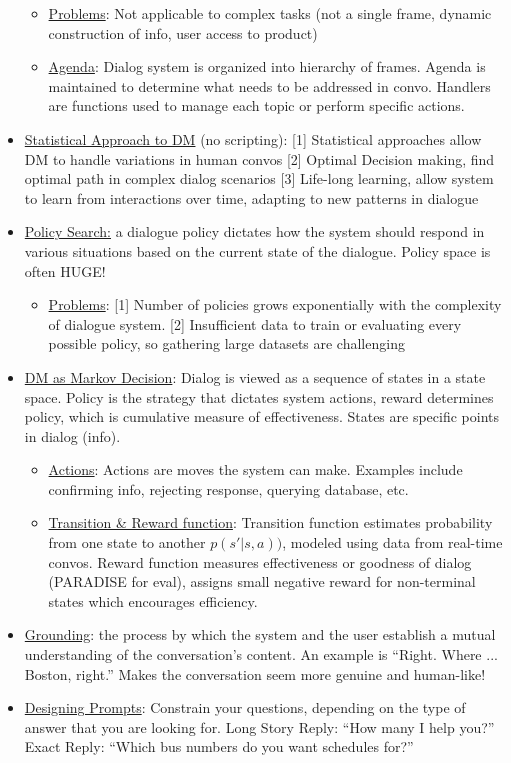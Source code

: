 \begin{itemize}
    \begin{itemize}
        \item \underline{Problems}: Not applicable to complex tasks (not a single frame, dynamic construction of info, user access to product)
        \item \underline{Agenda}: Dialog system is organized into hierarchy of frames. Agenda is maintained to determine what needs to be addressed in convo. Handlers are functions used to manage each topic or perform specific actions.
    \end{itemize}
    \item \underline{Statistical Approach to DM} (no scripting): [1] Statistical approaches allow DM to handle variations in human convos [2] Optimal Decision making, find optimal path in complex dialog scenarios [3] Life-long learning, allow system to learn from interactions over time, adapting to new patterns in dialogue
    \item \underline{Policy Search:} a dialogue policy dictates how the system should respond in various situations based on the current state of the dialogue. Policy space is often HUGE!
    \begin{itemize}
        \item \underline{Problems}: [1] Number of policies grows exponentially with the complexity of dialogue system. [2] Insufficient data to train or evaluating every possible policy, so gathering large datasets are challenging
    \end{itemize}
    \item \underline{DM as Markov Decision}: Dialog is viewed as a sequence of states in a state space. Policy is the strategy that dictates system actions, reward determines policy, which is cumulative measure of effectiveness. States are specific points in dialog (info). 
    \begin{itemize}
        \item \underline{Actions}: Actions are moves the system can make. Examples include confirming info, rejecting response, querying database, etc.
        \item \underline{Transition \& Reward function}: Transition function estimates probability from one state to another $p(s' | s,a))$, modeled using data from real-time convos. Reward function measures effectiveness or goodness of dialog (PARADISE for eval), assigns small negative reward for non-terminal states which encourages efficiency.
    \end{itemize}
    \item \underline{Grounding}: the process by which the system and the user establish a mutual understanding of the conversation's content. An example is ``Right. Where ... Boston, right.'' Makes the conversation seem more genuine and human-like!
    \item \underline{Designing Prompts}: Constrain your questions, depending on the type of answer that you are looking for. Long Story Reply: ``How many I help you?'' Exact Reply: ``Which bus numbers do you want schedules for?''
\end{itemize}
